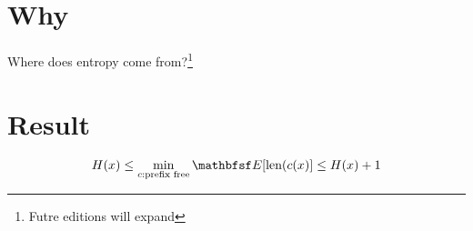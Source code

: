 

\section*{Why}

Where does entropy come from?\footnote{Futre editions will expand}

\section*{Result}

\[
H(x) \leq \min_{c: \text{prefix free}} \E [\text{len}(c(x)] \leq H(x) + 1
\]
\blankpage